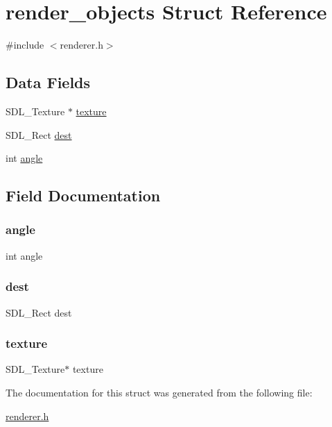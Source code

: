 \hypertarget{structrender__objects}{}\section{render\+\_\+objects Struct Reference}
\label{structrender__objects}


{\ttfamily \#include $<$renderer.\+h$>$}

\subsection*{Data Fields}
\begin{DoxyCompactItemize}
\item 
S\+D\+L\+\_\+\+Texture $\ast$ \mbox{\hyperlink{structrender__objects_a859b8efbf9abe8e82757ee5c75a0c97c}{texture}}
\item 
S\+D\+L\+\_\+\+Rect \mbox{\hyperlink{structrender__objects_a1d4c1bb15892e31b9af1f4fcf5d31fab}{dest}}
\item 
int \mbox{\hyperlink{structrender__objects_a63177970cacb40efba67ce501ea89210}{angle}}
\end{DoxyCompactItemize}


\subsection{Field Documentation}
\mbox{\label{structrender__objects_a63177970cacb40efba67ce501ea89210}} 
\subsubsection{\texorpdfstring{angle}{angle}}
{\footnotesize\ttfamily int angle}

\mbox{\label{structrender__objects_a1d4c1bb15892e31b9af1f4fcf5d31fab}} 
\subsubsection{\texorpdfstring{dest}{dest}}
{\footnotesize\ttfamily S\+D\+L\+\_\+\+Rect dest}

\mbox{\label{structrender__objects_a859b8efbf9abe8e82757ee5c75a0c97c}} 
\subsubsection{\texorpdfstring{texture}{texture}}
{\footnotesize\ttfamily S\+D\+L\+\_\+\+Texture$\ast$ texture}



The documentation for this struct was generated from the following file\+:\begin{DoxyCompactItemize}
\item 
\mbox{\hyperlink{renderer_8h}{renderer.\+h}}\end{DoxyCompactItemize}
